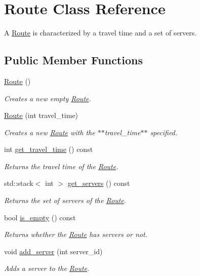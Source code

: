 \hypertarget{class_route}{
\section{Route Class Reference}
\label{class_route}
}


A \hyperlink{class_route}{Route} is characterized by a travel time and a set of servers.  


\subsection*{Public Member Functions}
\begin{DoxyCompactItemize}
\item 
\hyperlink{class_route_a2b1c971aaf032109cee8081c97e9b9e9}{Route} ()
\begin{DoxyCompactList}\small\item\em Creates a new empty \hyperlink{class_route}{Route}. \item\end{DoxyCompactList}\item 
\hyperlink{class_route_a0d4195a212515192000cded1e6fc6fe1}{Route} (int travel\_\-time)
\begin{DoxyCompactList}\small\item\em Creates a new \hyperlink{class_route}{Route} with the $\ast$$\ast$travel\_\-time$\ast$$\ast$ specified. \item\end{DoxyCompactList}\item 
int \hyperlink{class_route_ab76f0d401c7492ca2e16e8b4402bd544}{get\_\-travel\_\-time} () const 
\begin{DoxyCompactList}\small\item\em Returns the travel time of the \hyperlink{class_route}{Route}. \item\end{DoxyCompactList}\item 
std::stack$<$ int $>$ \hyperlink{class_route_adc747b5532d9e0150637e56f7f79c271}{get\_\-servers} () const 
\begin{DoxyCompactList}\small\item\em Returns the set of servers of the \hyperlink{class_route}{Route}. \item\end{DoxyCompactList}\item 
bool \hyperlink{class_route_ae50842073a24659f7b60885e2e9c8ff6}{is\_\-empty} () const 
\begin{DoxyCompactList}\small\item\em Returns whether the \hyperlink{class_route}{Route} has servers or not. \item\end{DoxyCompactList}\item 
void \hyperlink{class_route_a83ac0bdc29132d404c5fb00ab8729b4f}{add\_\-server} (int server\_\-id)
\begin{DoxyCompactList}\small\item\em Adds a server to the \hyperlink{class_route}{Route}. \item\end{DoxyCompactList}\end{DoxyCompactItemize}


